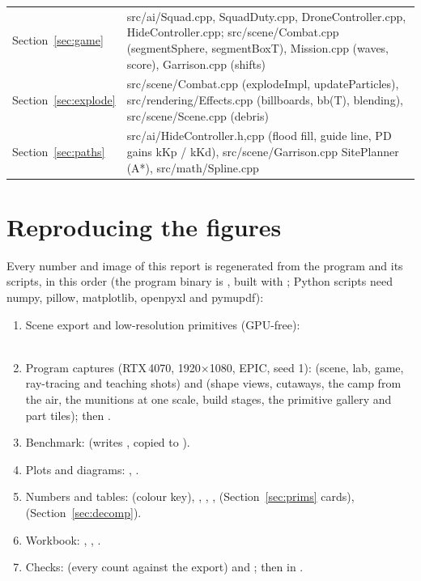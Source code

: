 \begin{longtable}{@{}l>{\raggedright\arraybackslash}p{14.2cm}@{}}
Section~\ref{sec:game} & {\raggedright\ttfamily\footnotesize src/ai/Squad.cpp, SquadDuty.cpp, DroneController.cpp, HideController.cpp; src/scene/Combat.cpp (segmentSphere, segmentBoxT), Mission.cpp (waves, score), Garrison.cpp (shifts)}\\
Section~\ref{sec:explode} & {\raggedright\ttfamily\footnotesize src/scene/Combat.cpp (explodeImpl, updateParticles), src/rendering/Effects.cpp (billboards, bb(T), blending), src/scene/Scene.cpp (debris)}\\
Section~\ref{sec:paths} & {\raggedright\ttfamily\footnotesize src/ai/HideController.{h,cpp} (flood fill, guide line, PD gains kKp / kKd), src/scene/Garrison.cpp SitePlanner (A*), src/math/Spline.cpp}\\
\end{longtable}

\section{Reproducing the figures}
\label{app:repro}
Every number and image of this report is regenerated from the program and its scripts, in this order (the program
binary is , built with ; Python scripts need numpy, pillow, matplotlib,
openpyxl and pymupdf):
\begin{enumerate}\raggedright
\item Scene export and low-resolution primitives (GPU-free):\\
\\
\item Program captures (RTX\,4070, 1920$\times$1080, EPIC, seed 1):  (scene, lab, game,
ray-tracing and teaching shots) and  (shape views, cutaways, the camp
from the air, the munitions at one scale, build stages, the primitive gallery and part tiles); then
.
\item Benchmark: 
(writes , copied to ).
\item Plots and diagrams: , .
\item Numbers and tables:  (colour key), ,
, ,  (Section~\ref{sec:prims}
cards),  (Section~\ref{sec:decomp}).
\item Workbook: , , .
\item Checks:  (every count against the export) and ;
then  in .
\end{enumerate}

